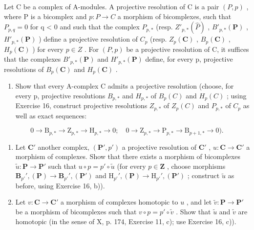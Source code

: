 Let C be a complex of A-modules. A projective resolution of C is a pair \((P, p)\) , where P is a bicomplex and \(p : P \to C\) a morphism of bicomplexes, such that \(P_{p,q} = 0\) for q \textless{} 0 and such that the complex \(P_{p,*}\) (resp. \(Z'_{p,*}(\hat{P})\) , \(B'_{p,*}(\mathbf{P})\) , \(H'_{p,*}(\mathbf{P})\) ) define a projective resolution of \(C_p\) (resp. \(Z_p(\mathbf{C})\) , \(B_p(\mathbf{C})\) , \(H_p(\mathbf{C})\) ) for every \(p \in Z\) . For \((P, p)\) be a projective resolution of C, it suffices that the complexes \(B'_{p,*}(\mathbf{P})\) and \(H'_{p,*}(\mathbf{P})\) define, for every p, projective resolutions of \(B_p(\mathbf{C})\) and \(H_p(\mathbf{C})\) .

\begin{enumerate}
\def\labelenumi{\alph{enumi})}
\tightlist
\item
  Show that every A-complex C admits a projective resolution (choose, for every p, projective resolutions \(B_{p,*}\) and \(H_{p,*}\) of \(B_{p}(C)\) and \(H_{p}(C)\) ; using Exercise 16, construct projective resolutions \(Z_{p,*}\) of \(Z_{p}(C)\) and \(P_{p,*}\) of \(C_{p}\) as well as exact sequences:
\end{enumerate}

\[
0 \rightarrow \mathrm{B} _ {p, *} \rightarrow \mathrm{Z} _ {p, *} \rightarrow \mathrm{H} _ {p, *} \rightarrow 0; \quad 0 \rightarrow \mathrm{Z} _ {p, *} \rightarrow \mathrm{P} _ {p, *} \rightarrow \mathrm{B} _ {p + 1, *} \rightarrow 0).
\]

\begin{enumerate}
\def\labelenumi{\alph{enumi})}
\setcounter{enumi}{1}
\item
  Let \(\mathbf{C}'\) another complex, \((\mathbf{P}', p')\) a projective resolution of \(\mathbf{C}'\) , \(u: \mathbf{C} \to \mathbf{C}'\) a morphism of complexes. Show that there exists a morphism of bicomplexes \(\tilde{u}: \mathbf{P} \to \mathbf{P}'\) such that \(u \circ p = p' \circ \tilde{u}\) (for every \(p \in \mathbf{Z}\) , choose morphisms \(\mathbf{B}_{p'}', (\mathbf{P}) \to \mathbf{B}_{p'}', (\mathbf{P}')\) and \(\mathrm{H}_{p'}', (\mathbf{P}) \to \mathrm{H}_{p'}', (\mathbf{P}')\) ; construct \(\tilde{u}\) as before, using Exercise 16, b)).
\item
  Let \(v: \mathbf{C} \to \mathbf{C}'\) a morphism of complexes homotopic to \(u\) , and let \(\tilde{v}: \mathbf{P} \to \mathbf{P}'\) be a morphism of bicomplexes such that \(v \circ p = p' \circ \tilde{v}\) . Show that \(\tilde{u}\) and \(\tilde{v}\) are homotopic (in the sense of X, p. 174, Exercise 11, c); use Exercise 16, c)).
\end{enumerate}

